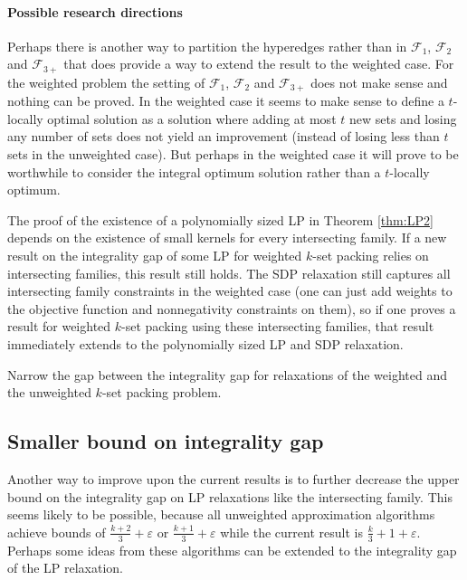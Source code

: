 \paragraph{Possible research directions} Perhaps there is another way to partition the hyperedges rather than in $\mathcal{F}_1$, $\mathcal{F}_2$ and $\mathcal{F}_{3+}$ that does provide a way to extend the result to the weighted case. For the weighted problem the setting of $\mathcal{F}_1$, $\mathcal{F}_2$ and $\mathcal{F}_{3+}$ does not make sense and nothing can be proved. In the weighted case it seems to make sense to define a $t$-locally optimal solution as a solution where adding at most $t$ new sets and losing any number of sets does not yield an improvement (instead of losing less than $t$ sets in the unweighted case). But perhaps in the weighted case it will prove to be worthwhile to consider the integral optimum solution rather than a $t$-locally optimum.

The proof of the existence of a polynomially sized LP in Theorem \ref{thm:LP2} depends on the existence of small kernels for every intersecting family. If a new result on the integrality gap of some LP for weighted $k$-set packing relies on intersecting families, this result still holds. The SDP relaxation still captures all intersecting family constraints in the weighted case (one can just add weights to the objective function and nonnegativity constraints on them), so if one proves a result for weighted $k$-set packing using these intersecting families, that result immediately extends to the polynomially sized LP and SDP relaxation.

\begin{prob}
Narrow the gap between the integrality gap for relaxations of the weighted and the unweighted $k$-set packing problem.
\end{prob}

\subsection{Smaller bound on integrality gap}\label{subsec:IntegralityGap}

Another way to improve upon the current results is to further decrease the upper bound on the integrality gap on LP relaxations like the intersecting family. This seems likely to be possible, because all unweighted approximation algorithms achieve bounds of $\frac{k+2}{3} + \varepsilon$ or $\frac{k+1}{3} + \varepsilon$ while the current result is $\frac{k}{3} + 1 + \varepsilon$. Perhaps some ideas from these algorithms can be extended to the integrality gap of the LP relaxation.

